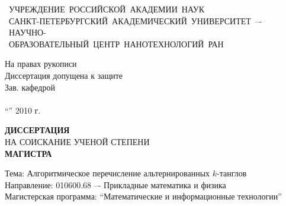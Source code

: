 \begin{titlepage}
{
	\newpage
	\fontsize{14pt}{22pt}

	\begin{center}
	{
		\fontsize{12pt}{20pt} \sf
		\mbox{ УЧРЕЖДЕНИЕ РОССИЙСКОЙ АКАДЕМИИ НАУК }\\[5pt]
		\mbox{ САНКТ-ПЕТЕРБУРГСКИЙ АКАДЕМИЧЕСКИЙ УНИВЕРСИТЕТ –- НАУЧНО- }\\
		\mbox{ ОБРАЗОВАТЕЛЬНЫЙ ЦЕНТР НАНОТЕХНОЛОГИЙ РАН }
	}
	\end{center}

	\vspace{20pt}
	\hfill
	\begin{minipage}{220pt}
		\begin{center}
		{
			\fontsize{12pt}{20pt}
			На правах рукописи\\[15pt]
			Диссертация допущена к защите\\
			Зав. кафедрой\\
			\vspace{10pt}
			\hspace{10pt}\hrulefill\hspace{10pt} \\
			\vspace{5pt}
			\hspace{25pt} ``\hspace{20pt}'' \hrulefill\hspace{5pt}2010 г. \hspace{25pt}
		}
		\end{center}
	\end{minipage}

	\vspace{30pt}
	\begin{center}
	{
		{ \bf ДИССЕРТАЦИЯ } \\
		{ НА СОИСКАНИЕ УЧЕНОЙ СТЕПЕНИ } \\[5pt]
		{ \bf МАГИСТРА } \\
	}
	\end{center}

	\vspace{10pt}
	\begin{flushleft}
	{
		Тема: Алгоритмическое перечисление альтернированных $k$-танглов \\
		\vspace{10pt}
		Направление: 010600.68 –- Прикладные математика и физика \\
		\vspace{10pt}
		Магистерская программа: ``Математические и информационные технологии'' \\
	}
	\end{flushleft}

}
\end{titlepage}
